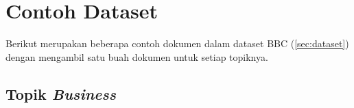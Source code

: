 \chapter{Contoh Dataset}
\label{lamp:C}

Berikut merupakan beberapa contoh dokumen dalam dataset BBC (\ref{sec:dataset}) dengan mengambil satu buah dokumen untuk setiap topiknya.

\section{Topik \textit{Business}}




